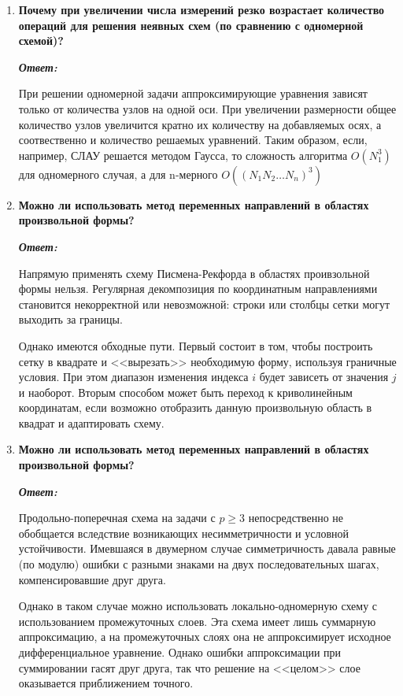 \documentclass[12pt, a4paper]{article}
\begin{document}
\begin{enumerate}
		\item \textbf{ Почему при увеличении числа измерений резко возрастает количество операций для решения неявных схем (по сравнению с одномерной схемой)?}
		\vspace*{0.2cm}
		
		\textit{\textbf{Ответ:}} 
		
		 При решении одномерной задачи аппроксимирующие уравнения зависят только от количества узлов на одной оси. При увеличении размерности общее количество узлов увеличится кратно их количеству на добавляемых осях, а соотвественно и количество решаемых уравнений. Таким образом, если, например, СЛАУ решается методом Гаусса, то сложность алгоритма $O(N_1^3)$ для одномерного случая, а для n-мерного $O((N_1 N_2 \ldots N_n)^3)$ 
		
		\item \textbf{Можно ли использовать метод переменных направлений в областях произвольной формы?}
		\vspace*{0.2cm}
		
		\textit{\textbf{Ответ:}}
		
		Напрямую применять схему Писмена-Рекфорда в областях проивзольной формы нельзя. Регулярная декомпозиция по координатным направлениями становится некорректной или невозможной: строки или столбцы сетки могут выходить за границы.
		
		Однако имеются обходные пути. Первый состоит в том, чтобы построить сетку в квадрате и <<вырезать>> необходимую форму, используя граничные условия. При этом диапазон изменения индекса $i$ будет зависеть от значения $j$ и наоборот. Вторым способом может быть переход к криволинейным координатам, если возможно отобразить данную произвольную область в квадрат и адаптировать схему.
		
		\item \textbf{Можно ли использовать метод переменных направлений в областях произвольной формы?}
		\vspace*{0.2cm}
		
		\textit{\textbf{Ответ:}}
		
		Продольно-поперечная схема на задачи с $p \ge 3$ непосредственно не обобщается вследствие возникающих несимметричности и условной устойчивости. Имевшаяся в двумерном случае симметричность давала равные (по модулю) ошибки с разными знаками на двух последовательных шагах, компенсировавшие друг друга.
		
		Однако в таком случае можно использовать локально-одномерную схему с использованием промежуточных слоев. Эта схема имеет лишь суммарную аппроксимацию, а на промежуточных слоях она не аппроксимирует исходное дифференциальное уравнение. Однако ошибки аппроксимации при суммировании гасят друг друга, так что решение на <<целом>> слое оказывается приближением точного.
		

\end{enumerate}
\end{document}
